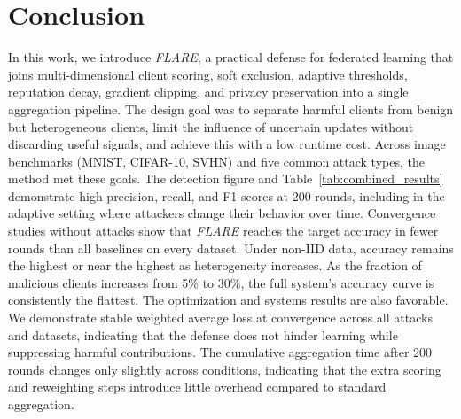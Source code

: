 \documentclass[lettersize,journal]{IEEEtran}
\begin{document}
{\section{Conclusion} \label{sec:conclusion}

In this work, we introduce \textit{FLARE}, a practical defense for federated learning that joins multi-dimensional client scoring, soft exclusion, adaptive thresholds, reputation decay, gradient clipping, and privacy preservation into a single aggregation pipeline. The design goal was to separate harmful clients from benign but heterogeneous clients, limit the influence of uncertain updates without discarding useful signals, and achieve this with a low runtime cost.
Across image benchmarks (MNIST, CIFAR-10, SVHN) and five common attack types, the method met these goals. The detection figure and Table~\ref{tab:combined_results} demonstrate high precision, recall, and F1-scores at 200 rounds, including in the adaptive setting where attackers change their behavior over time. Convergence studies without attacks show that \textit{FLARE} reaches the target accuracy in fewer rounds than all baselines on every dataset. Under non-IID data, accuracy remains the highest or near the highest as heterogeneity increases. As the fraction of malicious clients increases from 5\% to 30\%, the full system's accuracy curve is consistently the flattest.
The optimization and systems results are also favorable. We demonstrate stable weighted average loss at convergence across all attacks and datasets, indicating that the defense does not hinder learning while suppressing harmful contributions. The cumulative aggregation time after 200 rounds changes only slightly across conditions, indicating that the extra scoring and reweighting steps introduce little overhead compared to standard aggregation. 



}
\end{document}
